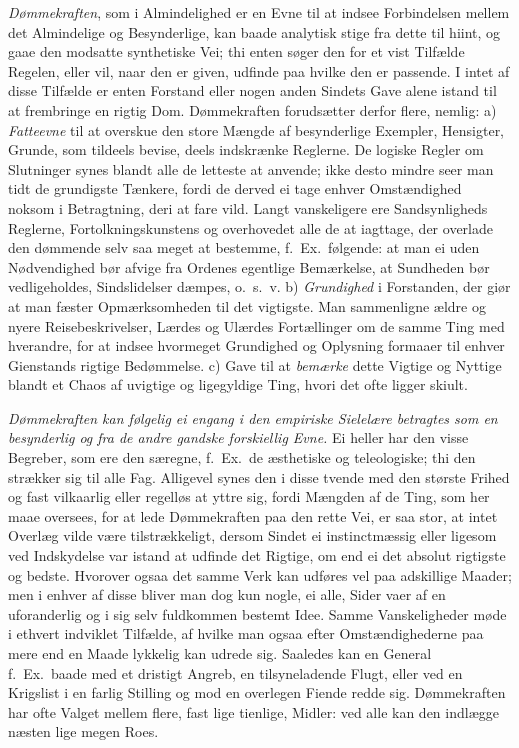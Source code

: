 \documentclass[12pt,a4paper]{article}
\newcommand{\opage}[1]{\marginnote{\footnotesize\textit{[#1]}}}
\begin{document}
\emph{Dømmekraften}, som i Almindelighed er en Evne til at indsee Forbindelsen mellem det
Almindelige og Besynderlige, kan baade analytisk stige fra dette til hiint, og gaae den
modsatte synthetiske Vei; thi enten søger den for et vist Tilfælde Regelen, eller vil,
naar den er given, udfinde paa hvilke den er passende. I intet af disse Tilfælde er enten
Forstand eller nogen anden Sindets Gave alene istand til at frembringe en rigtig Dom.
Dømmekraften forudsætter derfor flere, nemlig: a) \emph{Fatteevne} til at overskue den
store Mængde
\opage{162} af besynderlige Exempler, Hensigter, Grunde, som tildeels bevise, deels indskrænke
Reglerne. De logiske Regler om Slutninger synes blandt alle de letteste at anvende; ikke
desto mindre seer man tidt de grundigste Tænkere, fordi de derved ei tage enhver
Omstændighed noksom i Betragtning, deri at fare vild. Langt vanskeligere ere
Sandsynligheds Reglerne, Fortolkningskunstens og overhovedet alle de at iagttage, der
overlade den dømmende selv saa meget at bestemme, f.~Ex.\ følgende: at man ei uden
Nødvendighed bør afvige fra Ordenes egentlige Bemærkelse, at Sundheden bør vedligeholdes,
Sindslidelser dæmpes, o.~s.~v. b) \emph{Grundighed} i Forstanden, der giør at man fæster
Opmærksomheden til det vigtigste. Man sammenligne ældre og nyere Reisebeskrivelser, Lærdes
og Ulærdes Fortællinger om de samme Ting med hverandre, for at indsee hvormeget Grundighed
og Oplysning formaaer til enhver Gienstands rigtige Bedømmelse. c) Gave til at
\emph{bemærke} dette Vigtige og Nyttige blandt et Chaos af uvigtige og ligegyldige Ting,
hvori det ofte ligger skiult.

\emph{Dømmekraften kan følgelig ei engang i den empiriske Sielelære betragtes som en
besynderlig og fra de andre gandske forskiellig Evne.} Ei heller har den visse Begreber,
som ere den særegne, f.~Ex.\ de æsthetiske og teleologiske; thi den strækker sig til alle
Fag. Alligevel synes den i disse tvende med den største Frihed og fast
\opage{163} vilkaarlig eller regelløs at yttre sig, fordi Mængden af de Ting, som her maae oversees,
for at lede Dømmekraften paa den rette Vei, er saa stor, at intet Overlæg vilde være
tilstrækkeligt, dersom Sindet ei instinctmæssig eller ligesom ved Indskydelse var istand
at udfinde det Rigtige, om end ei det absolut rigtigste og bedste. Hvorover ogsaa det
samme Verk kan udføres vel paa adskillige Maader; men i enhver af disse bliver man dog kun
nogle, ei alle, Sider vaer af en uforanderlig og i sig selv fuldkommen bestemt Idee. Samme
Vanskeligheder møde i ethvert indviklet Tilfælde, af hvilke man ogsaa efter
Omstændighederne paa mere end en Maade lykkelig kan udrede sig. Saaledes kan en General
f.~Ex.\ baade med et dristigt Angreb, en tilsyneladende Flugt, eller ved en Krigslist i en
farlig Stilling og mod en overlegen Fiende redde sig. Dømmekraften har ofte Valget mellem
flere, fast lige tienlige, Midler: ved alle kan den indlægge næsten lige megen Roes.
\end{document}
